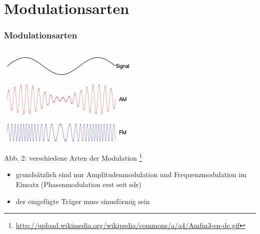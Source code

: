 \section[Arten]{Modulationsarten}
\begin{frame}
\frametitle{Modulationsarten}
\begin{center}
\includegraphics[scale=0.8]{e14/modulationen.jpg}\\
	Abb. 2: verschiedene Arten der Modulation
	\footnote{\url{http://upload.wikimedia.org/wikipedia/commons/a/a4/Amfm3-en-de.gif}}\\
	
\begin{itemize}
	\item grundsätzlich sind nur Amplitudenmodulation und Frequenzmodulation im Einsatz (Phasenmodulation erst seit sdr)
	\item der eingefügte Träger muss sinusförmig sein
\end{itemize}
\end{center}
\end{frame}


